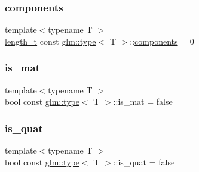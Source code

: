 \mbox{\label{structglm_1_1type_a678f2d75a5ec89fcaceb0934a52800b7}} 
\subsubsection{\texorpdfstring{components}{components}}
{\footnotesize\ttfamily template$<$typename T $>$ \\
\hyperlink{namespaceglm_a090a0de2260835bee80e71a702492ed9}{length\+\_\+t} const \hyperlink{structglm_1_1type}{glm\+::type}$<$ T $>$\+::\hyperlink{_s_d_l__opengl__glext_8h_a3824c86dfa50d23068c74eafb87375c2}{components} = 0\hspace{0.3cm}{\ttfamily [static]}}

\mbox{\label{structglm_1_1type_a21702de90bcb0212e4856a22d947bfa3}} 
\subsubsection{\texorpdfstring{is\+\_\+mat}{is\_mat}}
{\footnotesize\ttfamily template$<$typename T $>$ \\
bool const \hyperlink{structglm_1_1type}{glm\+::type}$<$ T $>$\+::is\+\_\+mat = false\hspace{0.3cm}{\ttfamily [static]}}

\mbox{\label{structglm_1_1type_ac0e332a405282f738486bc2134881df8}} 
\subsubsection{\texorpdfstring{is\+\_\+quat}{is\_quat}}
{\footnotesize\ttfamily template$<$typename T $>$ \\
bool const \hyperlink{structglm_1_1type}{glm\+::type}$<$ T $>$\+::is\+\_\+quat = false\hspace{0.3cm}{\ttfamily [static]}}

\mbox{\label{structglm_1_1type_a236fedee521c9783b686e86c0e1405e0}} 
